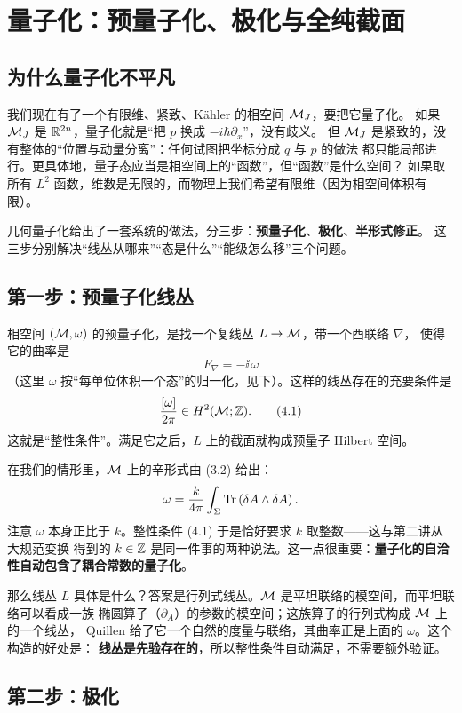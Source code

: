 \section{量子化：预量子化、极化与全纯截面}

\subsection{为什么量子化不平凡}

我们现在有了一个有限维、紧致、Kähler 的相空间 $\mathcal{M}_J$，要把它量子化。
如果 $\mathcal{M}_J$ 是 $\mathbb{R}^{2n}$，量子化就是“把 $p$ 换成 $-i\hbar\partial_x$”，没有歧义。
但 $\mathcal{M}_J$ 是紧致的，没有整体的“位置与动量分离”：任何试图把坐标分成 $q$ 与 $p$ 的做法
都只能局部进行。更具体地，量子态应当是相空间上的“函数”，但“函数”是什么空间？
如果取所有 $L^2$ 函数，维数是无限的，而物理上我们希望有限维（因为相空间体积有限）。

几何量子化给出了一套系统的做法，分三步：\textbf{预量子化}、\textbf{极化}、\textbf{半形式修正}。
这三步分别解决“线丛从哪来”“态是什么”“能级怎么移”三个问题。

\subsection{第一步：预量子化线丛}

相空间 $(\mathcal{M},\omega)$ 的预量子化，是找一个复线丛 $L\to\mathcal{M}$，带一个酉联络 $\nabla$，
使得它的曲率是
\[
F_\nabla=-\ii\,\omega
\]
（这里 $\omega$ 按“每单位体积一个态”的归一化，见下）。这样的线丛存在的充要条件是
\begin{equation}
\frac{[\omega]}{2\pi}\in H^2(\mathcal{M};\mathbb{Z}). \tag{4.1}
\end{equation}
这就是“整性条件”。满足它之后，$L$ 上的截面就构成预量子 Hilbert 空间。

在我们的情形里，$\mathcal{M}$ 上的辛形式由 (3.2) 给出：
\[
\omega=\frac{k}{4\pi}\int_\Sigma\operatorname{Tr}\left(\delta A\wedge\delta A\right).
\]
注意 $\omega$ 本身正比于 $k$。整性条件 (4.1) 于是恰好要求 $k$ 取整数——这与第二讲从大规范变换
得到的 $k\in\mathbb{Z}$ 是同一件事的两种说法。这一点很重要：\textbf{量子化的自洽性自动包含了耦合常数的量子化}。

那么线丛 $L$ 具体是什么？答案是行列式线丛。$\mathcal{M}$ 是平坦联络的模空间，而平坦联络可以看成一族
椭圆算子（$\bar\partial_A$）的参数的模空间；这族算子的行列式构成 $\mathcal{M}$ 上的一个线丛，
Quillen 给了它一个自然的度量与联络，其曲率正是上面的 $\omega$。这个构造的好处是：
\textbf{线丛是先验存在的}，所以整性条件自动满足，不需要额外验证。

\subsection{第二步：极化}

